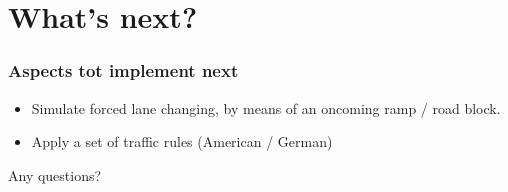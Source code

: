 \documentclass{beamer}
\begin{document}
\section{What's next?}
\begin{frame}
\frametitle{Aspects tot implement next}
\begin{itemize}
\item Simulate forced lane changing, by means of an oncoming ramp / road block.
\item Apply a set of traffic rules (American / German)
\end{itemize}
\end{frame}

\begin{frame}
\begin{center}
Any questions?
\end{center}
\end{frame}
\end{document}
